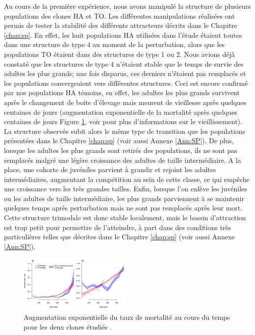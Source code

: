 Au cours de la première expérience, nous avons manipulé la structure de
plusieurs populations des clones HA et TO. Les différentes manipulations
réalisées ont permis de tester la stabilité des différents attracteurs décrits
dans le Chapitre \ref{chap:sp}. En effet, les huit populations HA utilisées
dans l'étude étaient toutes dans une structure de type 4 au moment de la
perturbation, alors que les populations TO étaient dans des structures de type 1
ou 2. Nous avions déjà constaté que les structures de type 4 n'étaient stable
que le temps de survie des adultes les plus grands; une fois disparus,
ces derniers n'étaient pas remplacés et les populations convergeaient vers
différentes structures. Ceci est encore confirmé par nos populations HA témoins,
en effet, les adultes les plus grands survivent après le changement de boite
d'élevage mais meurent de vieillesse après quelques centaines de jours
(augmentation exponentielle de la mortalité après quelques centaines de
jours Figure \ref{fig:SM8}, voir \citealp{mallard2013b} pour plus
d'informations sur le vieillissement).
La structure observée subit alors le même type de transition que les populations présentées
dans le Chapitre \ref{chap:sp} (voir aussi Annexe \ref{Ann:SP}). De plus,
lorsque les adultes les plus grands sont retirés des populations, ils ne sont pas remplacés malgré une légère
croissance des adultes de taille intermédiaire. A la place, une cohorte de
juvéniles parvient à grandir et rejoint les adultes intermédiaires, augmentant
la compétition au sein de cette classe, ce qui empêche une croissance vers les
très grandes tailles. Enfin, lorsque l'on enlève les juvéniles ou les adultes
de taille intermédiaire, les plus grands parviennent à se maintenir quelques
temps après perturbation mais ne sont pas remplacés après leur mort. Cette
structure trimodale est donc stable localement, mais le bassin d'attraction est
trop petit pour permettre de l'atteindre, à part dans des conditions très
particulières telles que décrites dans le Chapitre \ref{chap:sp} (voir aussi
Annexe \ref{Ann:SP}).

\begin{figure}[!ht]
\begin{center}
\includegraphics[width=0.5\textwidth]{1_CorpsDeThese/Resumes/Fig/SM08}
\caption[Augmentation
exponentielle du taux de mortalité au cours du temps]{Augmentation
exponentielle du taux de mortalité au cours du temps pour les deux clones
étudiés \autocites[d'après ][]{mallard2013b}.}
\label{fig:SM8}
\end{center}
\end{figure}

